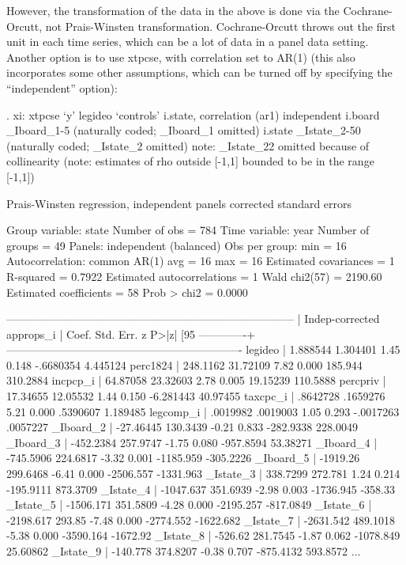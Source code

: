 \documentclass[12pt]{article}
\begin{document}
However, the transformation of the data in the above is done via the
Cochrane-Orcutt, not Prais-Winsten transformation. Cochrane-Orcutt
throws out the first unit in each time series, which can be a lot of
data in a panel data setting. Another option is to use xtpcse, with
correlation set to AR(1) (this also incorporates some other
assumptions, which can be turned off by specifying the ``independent''
option): 


   \begin{stlog}
. xi: xtpcse `y' legideo `controls' i.state, correlation (ar1) independent
i.board           _Iboard_1-5         (naturally coded; _Iboard_1 omitted)
i.state           _Istate_2-50        (naturally coded; _Istate_2 omitted)
note: _Istate_22 omitted because of collinearity
(note: estimates of rho outside [-1,1] bounded to be in the range [-1,1])

Prais-Winsten regression, independent panels corrected standard errors

Group variable:   state                         Number of obs      =       784
Time variable:    year                          Number of groups   =        49
Panels:           independent (balanced)        Obs per group: min =        16
Autocorrelation:  common AR(1)                                 avg =        16
                                                               max =        16
Estimated covariances      =         1          R-squared          =    0.7922
Estimated autocorrelations =         1          Wald chi2(57)      =   2190.60
Estimated coefficients     =        58          Prob > chi2        =    0.0000

------------------------------------------------------------------------------
             |           Indep-corrected
   approps_i |      Coef.   Std. Err.      z    P>|z|     [95%
-------------+----------------------------------------------------------------
     legideo |   1.888544   1.304401     1.45   0.148    -.6680354    4.445124
    perc1824 |   248.1162   31.72109     7.82   0.000      185.944    310.2884
    incpcp_i |   64.87058   23.32603     2.78   0.005     19.15239    110.5888
    percpriv |   17.34655   12.05532     1.44   0.150    -6.281443    40.97455
    taxcpc_i |   .8642728   .1659276     5.21   0.000     .5390607    1.189485
   legcomp_i |   .0019982   .0019003     1.05   0.293    -.0017263    .0057227
   _Iboard_2 |  -27.46445   130.3439    -0.21   0.833    -282.9338    228.0049
   _Iboard_3 |  -452.2384   257.9747    -1.75   0.080    -957.8594    53.38271
   _Iboard_4 |  -745.5906   224.6817    -3.32   0.001    -1185.959   -305.2226
   _Iboard_5 |   -1919.26   299.6468    -6.41   0.000    -2506.557   -1331.963
   _Istate_3 |   338.7299    272.781     1.24   0.214    -195.9111    873.3709
   _Istate_4 |  -1047.637   351.6939    -2.98   0.003    -1736.945     -358.33
   _Istate_5 |  -1506.171   351.5809    -4.28   0.000    -2195.257   -817.0849
   _Istate_6 |  -2198.617     293.85    -7.48   0.000    -2774.552   -1622.682
   _Istate_7 |  -2631.542   489.1018    -5.38   0.000    -3590.164    -1672.92
   _Istate_8 |    -526.62   281.7545    -1.87   0.062    -1078.849    25.60862
   _Istate_9 |   -140.778   374.8207    -0.38   0.707    -875.4132    593.8572
...
     

\end{stlog}
\end{document}
